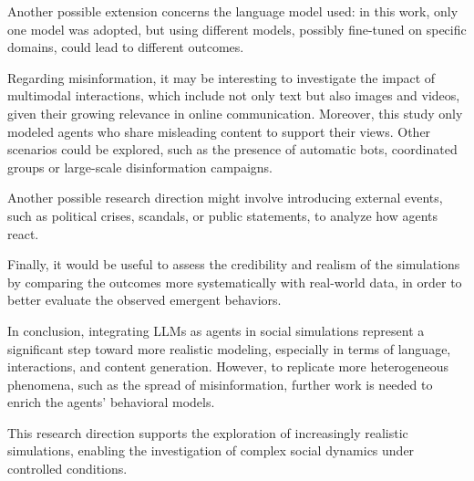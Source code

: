 Another possible extension concerns the language model used: in this work, only one model was adopted, but using different models, possibly fine-tuned on specific domains, could lead to different outcomes.

Regarding misinformation, it may be interesting to investigate the impact of multimodal interactions, which include not only text but also images and videos, given their growing relevance in online communication.
Moreover, this study only modeled agents who share misleading content to support their views. Other scenarios could be explored, such as the presence of automatic bots, coordinated groups or large-scale disinformation campaigns.

Another possible research direction might involve introducing external events, such as political crises, scandals, or public statements, to analyze how agents react.

Finally, it would be useful to assess the credibility and realism of the simulations by comparing the outcomes more systematically with real-world data, in order to better evaluate the observed emergent behaviors.


\medskip
In conclusion, integrating LLMs as agents in social simulations represent a significant step toward more realistic modeling, especially in terms of language, interactions, and content generation.
However, to replicate more heterogeneous phenomena, such as the spread of misinformation, further work is needed to enrich the agents' behavioral models.

This research direction supports the exploration of increasingly realistic simulations, enabling the investigation of complex social dynamics under controlled conditions. 
